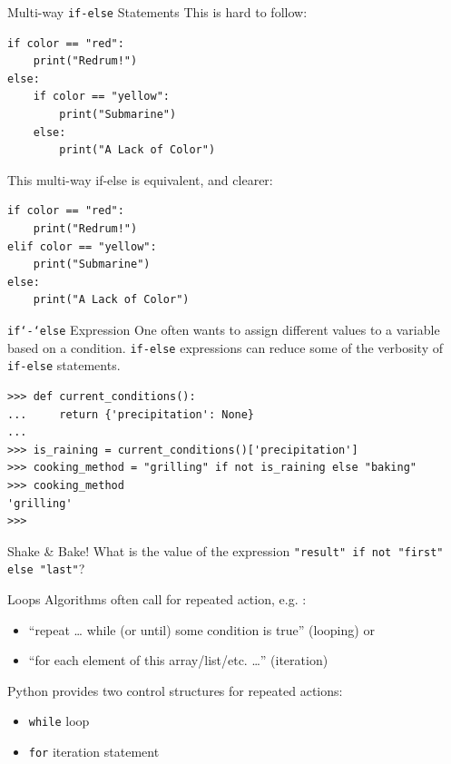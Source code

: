 \documentclass[smaller, aspectratio=1610]{beamer}
\begin{document}
\begin{frame}[label={sec:org80efecc},fragile]{Multi-way \texttt{if-else} Statements}
 This is hard to follow:

\lstset{language=Python,label= ,caption= ,captionpos=b,numbers=none}
\begin{lstlisting}
if color == "red":
    print("Redrum!")
else:
    if color == "yellow":
        print("Submarine")
    else:
        print("A Lack of Color")
\end{lstlisting}

This multi-way if-else is equivalent, and clearer:

\lstset{language=Python,label= ,caption= ,captionpos=b,numbers=none}
\begin{lstlisting}
if color == "red":
    print("Redrum!")
elif color == "yellow":
    print("Submarine")
else:
    print("A Lack of Color")
\end{lstlisting}
\end{frame}

\begin{frame}[label={sec:orgc35f045},fragile]{\texttt{if`-`else} Expression}
 One often wants to assign different values to a variable based on a condition.  \texttt{if-else} expressions can reduce some of the verbosity of \texttt{if-else} statements.

\lstset{language=Python,label= ,caption= ,captionpos=b,numbers=none}
\begin{lstlisting}
>>> def current_conditions():
...     return {'precipitation': None}
...
>>> is_raining = current_conditions()['precipitation']
>>> cooking_method = "grilling" if not is_raining else "baking"
>>> cooking_method
'grilling'
>>>
\end{lstlisting}
\end{frame}

\begin{frame}[label={sec:orge66da50},fragile]{Shake \& Bake!}
 What is the value of the expression \texttt{"result" if not "first" else "last"}?
\end{frame}

\begin{frame}[label={sec:org2b2707e},fragile]{Loops}
 Algorithms often call for repeated action, e.g. :

\begin{itemize}
\item “repeat \ldots{} while (or until) some condition is true” (looping) or
\item “for each element of this array/list/etc. \ldots{}” (iteration)
\end{itemize}

Python provides two control structures for repeated actions:

\begin{itemize}
\item \texttt{while} loop
\item \texttt{for} iteration statement
\end{itemize}
\end{frame}
\end{document}
